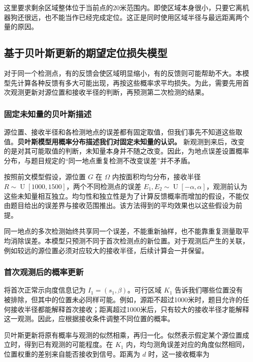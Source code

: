 这里要求剩余区域整体位于当前点的20米范围内。即使区域本身很小，只要它离机器狗还很远，也不能当作已经完成定位。这正是同时使用区域半径与最远距离两个量的原因。

\subsection{基于贝叶斯更新的期望定位损失模型}

对于同一个检测点，有的反馈会使区域明显缩小，有的反馈则可能帮助不大。本模型先计算各种反馈有多大可能出现，再按这些概率求平均损失。为此，需要先用首次观测更新对源位置和接收半径的判断，再预测第二次检测的结果。

\subsubsection{固定未知量的贝叶斯描述}

源位置、接收半径和各检测地点的误差都有固定取值，但我们事先不知道这些取值。\textbf{贝叶斯模型用概率分布描述我们对固定未知量的认识。} 新观测到来后，改变的是对其可能取值的判断，未知量本身并不随之改变。因此，为地点误差设置概率分布，与题目规定的“同一地点重复检测不改变误差”并不矛盾。

按照前文模型假设，源位置 \(G\) 在 \(\Omega\) 内按面积均匀分布，接收半径 \(R\sim\operatorname{U}[1000,1500]\)，两个不同检测点的误差 \(E_1,E_2\sim\operatorname{U}[-\alpha,\alpha]\)，观测前认为这些未知量相互独立。均匀性和独立性是为了计算反馈概率而增加的假设，不能仅由题目给出的误差界与接收范围推出。该方法得到的平均效果也以这些假设为前提。

同一地点的多次检测始终共享同一个误差，不能重新抽样，也不能靠重复测量取平均消除误差。本模型只预测不同于首次检测点的新位置。对于观测后产生的关联，例如较远的源位置必须对应较大的接收半径，后续计算会一并保留。

\subsubsection{首次观测后的概率更新}

将首次正常示向度信息记为 \(I_1=(s_1,\beta)\)。可行区域 \(K_1\) 告诉我们哪些位置没有被排除，但其中的位置未必同样可能。例如，源距不超过1000米时，题目允许的任何接收半径都能解释首次接收；距离超过1000米后，只有较大的接收半径才能解释这一观测。因此，应根据接收条件调整不同位置的概率。

贝叶斯更新将原有概率与观测的似然相乘，再归一化。似然表示假定某个源位置成立时，得到已有观测的可能程度。在 \(K_1\) 内，均匀测角误差对应的角度似然相同，位置权重的差别来自能否接收到信号。距离为 \(d\) 时，这一接收概率为


